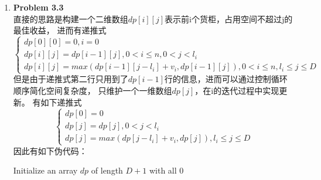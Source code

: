 \documentclass{ctexart}
\begin{document}
\begin{enumerate}[label=\arabic*.]
\begin{algorithm}[H]
            $l \leftarrow 0$, $j \leftarrow n-1$\;
            $Closest \leftarrow Sorted(P[0:k], \text{key}=dist, \text{order}=descending)$\;
            Initialize array $I$ of length $k$\;
            \Return $I$\;
        \end{algorithm}
    \item \textbf{Problem 3.3}\\
        直接的思路是构建一个二维数组$dp[i][j]$表示前i个货柜，占用空间不超过j的最佳收益，
        进而有递推式\[ \begin{cases}
            dp[0][0]=0,i=0\\
            dp[i][j]=dp[i-1][j],0<i\le{n},0<j<l_i\\
            dp[i][j]=max(dp[i-1][j-l_{i}]+v_i, dp[i-1][j]),0<i\le{n},l_i\le{j}\le{D}
        \end{cases}\]
        但是由于递推式第二行只用到了$dp[i-1]$行的信息，进而可以通过控制循环顺序简化空间复杂度，
        只维护一个一维数组$dp[j]$，在i的迭代过程中实现更新。
        有如下递推式\[\begin{cases}
            dp[0]=0\\
            dp[j]=dp[j],0<j<l_i\\
            dp[j]=max(dp[j-l_i]+v_i,dp[j]), l_i\le{j}\le{D}
        \end{cases}\]因此有如下伪代码：\\
        \begin{algorithm}[H]
            \SetAlgoLined
            \caption{计算货柜最大仓储收益}
            
            Initialize an array $dp$ of length $D+1$ with all $0$\;
            

\end{algorithm}
\end{enumerate}
\end{document}
